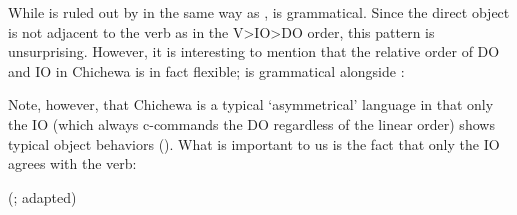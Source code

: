 \documentclass[output=paper,colorlinks,citecolor=brown
]{langscibook}
\begin{document}
 While  is ruled out by  in the same way as ,  is grammatical. Since the direct object is not adjacent to the verb as in the V>IO>DO order, this pattern is unsurprising. However, it is interesting to mention that the relative order of DO and IO in Chichewa is in fact flexible;  is grammatical alongside :

\begin{exe}
\begin{xlist}
  \resumeex  
  \label{ex:chen:ditrreverse}
\end{xlist}
\end{exe}

 Note, however, that Chichewa is a typical `asymmetrical' language in that only the IO (which always c-commands the DO regardless of the linear order) shows typical object behaviors (\citealt{mchombo2004syntax,van2022featural}). What is important to us is the fact that only the IO agrees with the verb:

\ea
  \begin{xlist}


  \hfill (\citealp{mchombo2004syntax}; adapted)\label{ex:chen:DOagree}

  \end{xlist}
\z
\end{document}

